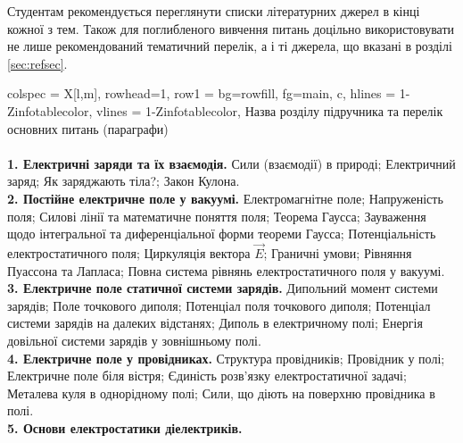 \documentclass{Syllabus}
\begin{document}
Студентам рекомендується переглянути списки літературних джерел в кінці кожної з тем. Також для поглибленого вивчення питань доцільно використовувати не лише рекомендований тематичний перелік, а і ті джерела, що вказані в розділі \ref{sec:refsec}.

\begin{longtblr}[
	]{
	colspec = {X[l,m]},
    rowhead=1,
	row{1} = {bg=rowfill, fg=main,  c},
	hlines = {1-Z}{infotablecolor},
	vlines = {1-Z}{infotablecolor},
	}
	Назва розділу підручника та перелік основних питань (параграфи)
    \\
    \\
	\textbf{1. Електричні заряди та їх взаємодія.}\newline
    Сили (взаємодії) в природі; Електричний заряд; Як заряджають тіла?; Закон Кулона.
    \\
	\textbf{2. Постійне електричне поле у вакуумі.}\newline
    Електромагнітне поле; Напруженість поля; Силові лінії та математичне поняття поля; Теорема Гаусса; Зауваження щодо інтегральної та диференціальної форми теореми Гаусса; Потенціальність електростатичного поля; Циркуляція вектора $\vec{E}$; Граничні умови; Рівняння Пуассона та Лапласа; Повна система рівнянь електростатичного поля у вакуумі.
    \\
	\textbf{3. Електричне поле статичної системи зарядів.}\newline
    Дипольний момент системи зарядів; Поле точкового диполя; Потенціал поля точкового диполя; Потенціал системи зарядів на далеких відстанях; Диполь в електричному полі; Енергія довільної системи зарядів у зовнішньому полі.
    \\
	\textbf{4. Електричне поле у провідниках.}\newline
    Структура провідників; Провідник у полі; Електричне поле біля вістря; Єдиність розв’язку електростатичної задачі; Металева куля в однорідному полі; Сили, що діють на поверхню провідника в полі.
    \\
	\textbf{5. Основи електростатики діелектриків.}\newline

\end{longtblr}
\end{document}
